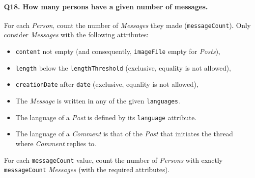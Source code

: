 \paragraph{\textbf{Q18}. How many persons have a given number of messages.}
For each \emph{Person}, count the number of \emph{Messages} they made
(\texttt{messageCount}). Only consider \emph{Messages} with the
following attributes:
\begin{itemize}
\item
  \texttt{content} not empty (and consequently, \texttt{imageFile} empty
  for \emph{Posts}),
\item
  \texttt{length} below the \texttt{lengthThreshold} (exclusive,
  equality is not allowed),
\item
  \texttt{creationDate} after \texttt{date} (exclusive, equality is not
  allowed),
\item
  The \emph{Message} is written in any of the given \texttt{languages}.
\item
  The language of a \emph{Post} is defined by its \texttt{language}
  attribute.
\item
  The language of a \emph{Comment} is that of the \emph{Post} that
  initiates the thread where \emph{Comment} replies to.
\end{itemize}
For each \texttt{messageCount} value, count the number of \emph{Persons}
with exactly \texttt{messageCount} \emph{Messages} (with the required
attributes).
